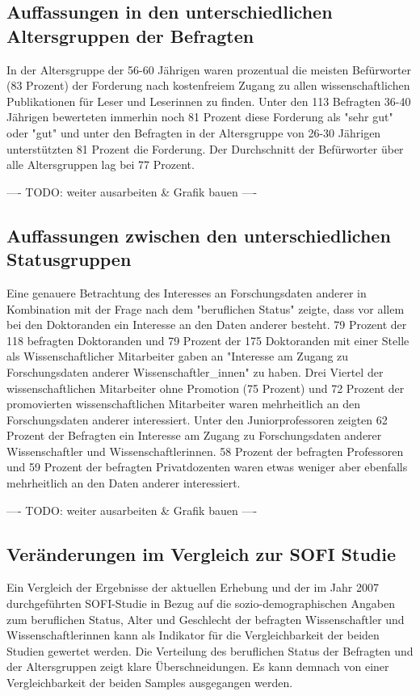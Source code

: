\subsection{Auffassungen in den unterschiedlichen Altersgruppen der Befragten}

In der Altersgruppe der 56-60 Jährigen waren prozentual die meisten Befürworter (83 Prozent) der Forderung nach kostenfreiem Zugang zu allen wissenschaftlichen Publikationen für Leser und Leserinnen zu finden. Unter den 113 Befragten 36-40 Jährigen bewerteten immerhin noch 81 Prozent diese Forderung als "sehr gut" oder "gut" und unter den Befragten in der Altersgruppe von 26-30 Jährigen unterstützten 81 Prozent die Forderung. Der Durchschnitt der Befürworter über alle Altersgruppen lag bei 77 Prozent.

---- TODO: weiter ausarbeiten & Grafik bauen ----

\subsection{Auffassungen zwischen den unterschiedlichen Statusgruppen}

Eine genauere Betrachtung des Interesses an Forschungsdaten anderer in Kombination mit der Frage nach dem "beruflichen Status" zeigte, dass vor allem bei den Doktoranden ein Interesse an den Daten anderer besteht. 79 Prozent der 118 befragten Doktoranden und 79 Prozent der 175 Doktoranden mit einer Stelle als Wissenschaftlicher Mitarbeiter gaben an "Interesse am Zugang zu Forschungsdaten anderer Wissenschaftler_innen" zu haben. Drei Viertel der wissenschaftlichen Mitarbeiter ohne Promotion (75 Prozent) und 72 Prozent der promovierten wissenschaftlichen Mitarbeiter waren mehrheitlich an den Forschungsdaten anderer interessiert. Unter den Juniorprofessoren zeigten 62 Prozent der Befragten ein Interesse am Zugang zu Forschungsdaten anderer Wissenschaftler und Wissenschaftlerinnen. 58 Prozent der befragten Professoren und 59 Prozent der befragten Privatdozenten waren etwas weniger aber ebenfalls mehrheitlich an den Daten anderer interessiert.

---- TODO: weiter ausarbeiten &  Grafik bauen ----

\subsection{Veränderungen im Vergleich zur SOFI Studie}

Ein Vergleich der Ergebnisse der aktuellen Erhebung und der im Jahr 2007 durchgeführten SOFI-Studie in Bezug auf die sozio-demographischen Angaben zum beruflichen Status, Alter und Geschlecht der befragten Wissenschaftler und Wissenschaftlerinnen kann als Indikator für die Vergleichbarkeit der beiden Studien gewertet werden. Die Verteilung des beruflichen Status der Befragten und der Altersgruppen zeigt klare Überschneidungen. Es kann demnach von einer Vergleichbarkeit der beiden Samples ausgegangen werden.

